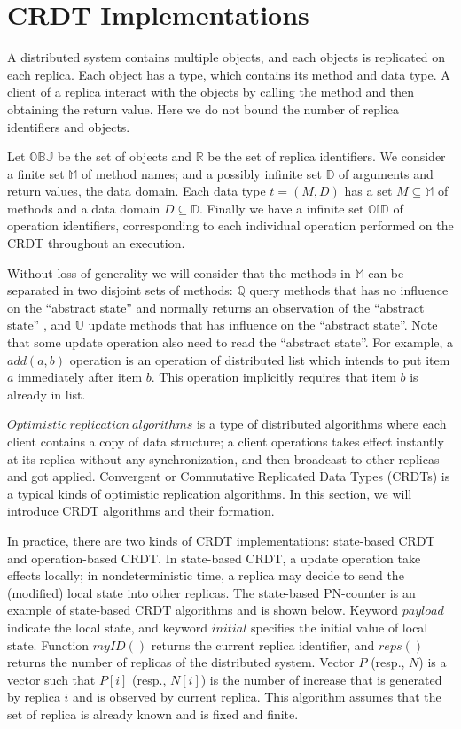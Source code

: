 
\section{CRDT Implementations}
\label{sec:CRDT implementations}

A distributed system contains multiple objects, and each objects is replicated on each replica. Each object has a type, which contains its method and data type. A client of a replica interact with the objects by calling the method and then obtaining the return value. Here we do not bound the number of replica identifiers and objects.

Let $\mathbb{OBJ}$ be the set of objects and $\mathbb{R}$ be the set of replica identifiers. We consider a finite set $\mathbb{M}$ of method names; and a possibly infinite set $\mathbb{D}$ of arguments and return values, the data domain. Each data type $t = (M,D)$ has a set $M \subseteq \mathbb{M}$ of methods and a data domain $D \subseteq \mathbb{D}$. Finally we have a infinite set $\mathbb{OID}$ of operation identifiers, corresponding to each individual operation performed on the CRDT throughout an execution.

Without loss of generality we will consider that the methods in $\mathbb{M}$ can be separated in two disjoint sets of methods: $\mathbb{Q}$ query methods that has no influence on the ``abstract state'' and normally returns an observation of the ``abstract state'' , and $\mathbb{U}$ update methods that has influence on the ``abstract state''. Note that some update operation also need to read the ``abstract state''. For example, a $add(a,b)$ operation is an operation of distributed list which intends to put item $a$ immediately after item $b$. This operation implicitly requires that item $b$ is already in list.

$\mathit{Optimistic \ replication \ algorithms}$ is a type of distributed algorithms where each client contains a copy of data structure; a client operations takes effect instantly at its replica without any synchronization, and then broadcast to other replicas and got applied. Convergent or Commutative Replicated Data Types (CRDTs) is a typical kinds of optimistic replication algorithms. In this section, we will introduce CRDT algorithms and their formation.

In practice, there are two kinds of CRDT implementations: state-based CRDT and operation-based CRDT. In state-based CRDT, a update operation take effects locally; in nondeterministic time, a replica may decide to send the (modified) local state into other replicas. The state-based PN-counter is an example of state-based CRDT algorithms and is shown below. Keyword $\mathit{payload}$ indicate the local state, and keyword $\mathit{initial}$ specifies the initial value of local state. Function $\mathit{myID}()$ returns the current replica identifier, and $\mathit{reps}()$ returns the number of replicas of the distributed system. Vector $P$ (resp., $N$) is a vector such that $P[i]$ (resp., $N[i]$) is the number of increase that is generated by replica $i$ and is observed by current replica. This algorithm assumes that the set of replica is already known and is fixed and finite.

